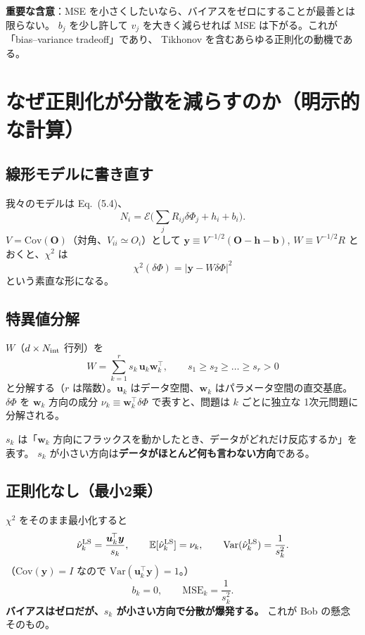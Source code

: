 \documentclass[11pt,a4paper]{ltjsarticle}
\newcommand{\dP}{\delta\Phi}
\newcommand{\E}{\mathbb{E}}
\newcommand{\Var}{\mathrm{Var}}
\newcommand{\Cov}{\mathrm{Cov}}
\begin{document}
\textbf{重要な含意}：MSE を小さくしたいなら、バイアスをゼロにすることが最善とは限らない。
$b_j$ を少し許して $v_j$ を大きく減らせれば MSE は下がる。これが「bias--variance tradeoff」であり、
Tikhonov を含むあらゆる正則化の動機である。

\section{なぜ正則化が分散を減らすのか（明示的な計算）}

\subsection*{線形モデルに書き直す}
我々のモデルは Eq.~(5.4)、
\begin{equation}
N_i=\mathcal{E}\Big(\sum_j R_{ij}\dP_j+h_i+b_i\Big).
\end{equation}
$V=\Cov(\bm O)$（対角、$V_{ii}\simeq O_i$）として $\bm y\equiv V^{-1/2}(\bm O-\bm h-\bm b)$,
$W\equiv V^{-1/2}R$ とおくと、$\chi^2$ は
\begin{equation}
\chi^2(\dP)=\big|\bm y-W\dP\big|^2
\end{equation}
という素直な形になる。

\subsection*{特異値分解}
$W$（$d\times N_{\rm int}$ 行列）を
\begin{equation}
W=\sum_{k=1}^{r}s_k\,\bm u_k\bm w_k^{\!\top},\qquad s_1\ge s_2\ge\dots\ge s_r>0
\end{equation}
と分解する（$r$ は階数）。$\bm u_k$ はデータ空間、$\bm w_k$ はパラメータ空間の直交基底。
$\dP$ を $\bm w_k$ 方向の成分 $\nu_k\equiv\bm w_k^{\!\top}\dP$ で表すと、問題は $k$ ごとに独立な
1次元問題に分解される。

$s_k$ は「$\bm w_k$ 方向にフラックスを動かしたとき、データがどれだけ反応するか」を表す。
$s_k$ が小さい方向は\textbf{データがほとんど何も言わない方向}である。

\subsection*{正則化なし（最小2乗）}
$\chi^2$ をそのまま最小化すると
\begin{equation}
\hat\nu_k^{\rm LS}=\frac{\bm u_k^{\!\top}\bm y}{s_k},\qquad
\E[\hat\nu_k^{\rm LS}]=\nu_k,\qquad
\Var(\hat\nu_k^{\rm LS})=\frac{1}{s_k^2}.
\end{equation}
（$\Cov(\bm y)=I$ なので $\Var(\bm u_k^{\!\top}\bm y)=1$。）
\begin{equation}
b_k=0,\qquad \mathrm{MSE}_k=\frac{1}{s_k^{2}} .
\end{equation}
\textbf{バイアスはゼロだが、$s_k$ が小さい方向で分散が爆発する。} これが Bob の懸念そのもの。
\end{document}
